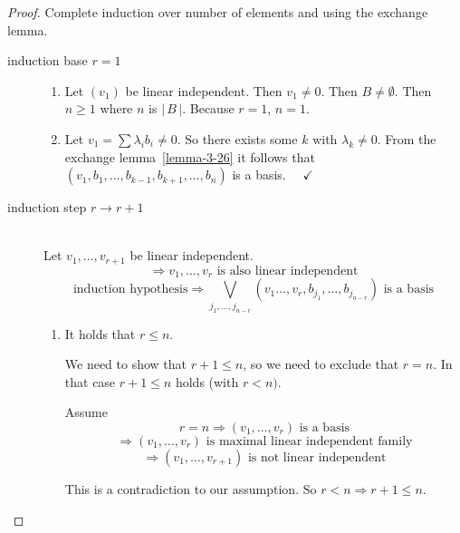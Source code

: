 \documentclass[a4paper,landscape,twocolumn]{article}
\newcommand\card[1]{\left|\,#1\,\right|}
\begin{document}
\begin{proof}
  Complete induction over number of elements and using the exchange lemma.
  \begin{description}
    \item[induction base $r=1$] \hfill{}
      \begin{enumerate}
        \item
          Let $(v_1)$ be linear independent. Then $v_1 \neq 0$. Then $B \neq \emptyset$.
          Then $n \geq 1$ where $n$ is $\card{B}$.
          Because $r = 1$, $n = 1$.
        \item
          Let $v_1 = \sum \lambda_i b_i \neq 0$.
          So there exists some $k$ with $\lambda_k \neq 0$.
          From the exchange lemma~\ref{lemma-3-26} it follows
          that $(v_1, b_1, \dots, b_{k-1}, b_{k+1}, \dots, b_n)$ is a basis.
          $\quad \checkmark$
      \end{enumerate}
    \item[induction step $r \rightarrow r+1$] \hfill{} \\
      Let $v_{1}, \dots, v_{r+1}$ be linear independent.
      \[ \Rightarrow v_1, \ldots, v_r \text{ is also linear independent} \]
      \[ \text{induction hypothesis} \Rightarrow \bigvee_{j_1, \dots, j_{n-r}} (v_1 \ldots, v_r, b_{j_1}, \dots, b_{j_{n-r}}) \text{ is a basis} \]
      \begin{enumerate}
        \item It holds that $r \leq n$.

          We need to show that $r+1 \leq n$, so we need to exclude that $r = n$.
          In that case $r + 1 \leq n$ holds (with $r < n)$.

          Assume
          \[ r = n \Rightarrow (v_1, \ldots, v_r) \text{ is a basis} \]
          \[ \Rightarrow (v_1, \dots, v_r) \text{ is maximal linear independent family} \]
          \[ \Rightarrow (v_1, \dots, v_{r + 1}) \text{ is not linear independent} \]

          This is a contradiction to our assumption.
          So $r < n \Rightarrow r+1 \leq n$.


\end{enumerate}
\end{description}
\end{proof}
\end{document}
